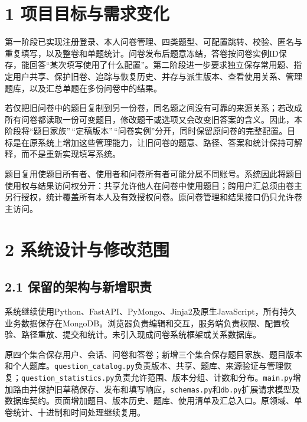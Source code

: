 \section{1 项目目标与需求变化}\label{ux9879ux76eeux76eeux6807ux4e0eux9700ux6c42ux53d8ux5316}

第一阶段已实现注册登录、本人问卷管理、四类题型、可配置跳转、校验、匿名与重复填写，以及整卷和单题统计。问卷发布后题意冻结，答卷按问卷实例ID保存，能回答``某次填写使用了什么配置''。第二阶段进一步要求独立保存常用题、指定用户共享、保护旧卷、追踪与恢复历史、并存与派生版本、查看使用关系、管理题库，以及汇总单题在多份问卷中的结果。

若仅把旧问卷中的题目复制到另一份卷，同名题之间没有可靠的来源关系；若改成所有问卷都读取一份可变题目，修改题干或选项又会改变旧答案的含义。因此，本阶段将``题目家族''\,``定稿版本''\,``问卷实例''分开，同时保留原问卷的完整配置。目标是在原系统上增加这些管理能力，让旧问卷的题意、路径、答案和统计保持可解释，而不是重新实现填写系统。

题目复用使题目所有者、使用者和问卷所有者可能分属不同账号。系统因此将题目使用权与结果访问权分开：共享允许他人在问卷中使用题目；跨用户汇总须由卷主另行授权，统计覆盖所有本人及有效授权问卷。原问卷管理和结果接口仍只允许卷主访问。

\section{2 系统设计与修改范围}\label{ux7cfbux7edfux8bbeux8ba1ux4e0eux4feeux6539ux8303ux56f4}

\subsection{2.1 保留的架构与新增职责}\label{ux4fddux7559ux7684ux67b6ux6784ux4e0eux65b0ux589eux804cux8d23}

系统继续使用Python、FastAPI、PyMongo、Jinja2及原生JavaScript，所有持久业务数据保存在MongoDB。浏览器负责编辑和交互，服务端负责权限、配置校验、路径重放、提交和统计。未引入现成问卷系统框架或关系数据库。

原四个集合保存用户、会话、问卷和答卷；新增三个集合保存题目家族、题目版本和个人题库。\nolinkurl{question_catalog.py}负责版本、共享、题库、来源验证与管理恢复；\nolinkurl{question_statistics.py}负责允许范围、版本分组、计数和分布。\nolinkurl{main.py}增加路由并保护旧草稿保存、发布和填写响应，\nolinkurl{schemas.py}和\nolinkurl{db.py}扩展请求模型及数据库契约。页面增加题目、版本历史、题库、使用清单及汇总入口。原领域、单卷统计、十进制和时间处理继续复用。

